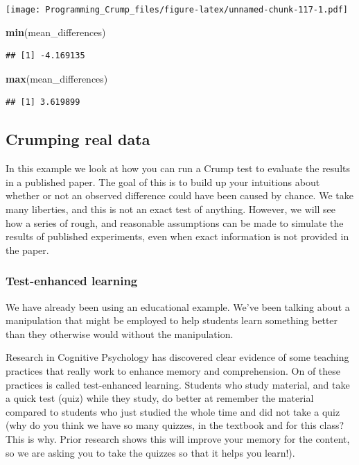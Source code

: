 \documentclass[]{book}
\newenvironment{Shaded}{\begin{snugshade}}{\end{snugshade}}
\newcommand{\KeywordTok}[1]{\textcolor[rgb]{0.13,0.29,0.53}{\textbf{{#1}}}}
\newcommand{\NormalTok}[1]{{#1}}
\theoremstyle{definition}
\theoremstyle{definition}
\theoremstyle{definition}
\theoremstyle{remark}
\begin{document}
\texttt{[image: Programming\_Crump\_files/figure-latex/unnamed-chunk-117-1.pdf]}

\begin{Shaded}
\begin{Highlighting}[]
\KeywordTok{min}\NormalTok{(mean_differences)}
\end{Highlighting}
\end{Shaded}

\begin{verbatim}
## [1] -4.169135
\end{verbatim}

\begin{Shaded}
\begin{Highlighting}[]
\KeywordTok{max}\NormalTok{(mean_differences)}
\end{Highlighting}
\end{Shaded}

\begin{verbatim}
## [1] 3.619899
\end{verbatim}

\subsection{Crumping real data}\label{crumping-real-data}

In this example we look at how you can run a Crump test to evaluate the
results in a published paper. The goal of this is to build up your
intuitions about whether or not an observed difference could have been
caused by chance. We take many liberties, and this is not an exact test
of anything. However, we will see how a series of rough, and reasonable
assumptions can be made to simulate the results of published
experiments, even when exact information is not provided in the paper.

\subsubsection{Test-enhanced learning}\label{test-enhanced-learning}

We have already been using an educational example. We've been talking
about a manipulation that might be employed to help students learn
something better than they otherwise would without the manipulation.

Research in Cognitive Psychology has discovered clear evidence of some
teaching practices that really work to enhance memory and comprehension.
On of these practices is called test-enhanced learning. Students who
study material, and take a quick test (quiz) while they study, do better
at remember the material compared to students who just studied the whole
time and did not take a quiz (why do you think we have so many quizzes,
in the textbook and for this class? This is why. Prior research shows
this will improve your memory for the content, so we are asking you to
take the quizzes so that it helps you learn!).
\end{document}
